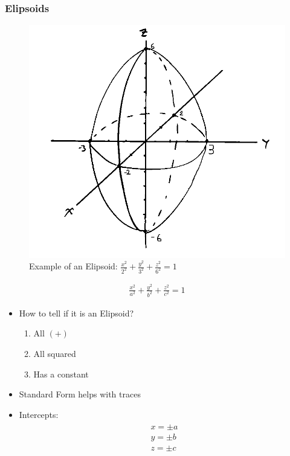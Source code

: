 \documentclass{article}
\begin{document}
\subsubsection{Elipsoids}
\begin{figure}[h]
  \includegraphics[scale=0.5]{elipsoid}
  \centering
  \caption{Example of an Elipsoid: $\frac{x^2}{2^2} + \frac{y^2}{3^2} + \frac{z^2}{6^2} = 1$}
  \label{fig:elipsoid}
\end{figure}
\begin{align}
  \frac{x^2}{a^2} + \frac{y^2}{b^2} + \frac{z^2}{c^2} = 1
\end{align}
\begin{itemize}
  \item How to tell if it is an Elipsoid?
  \begin{enumerate}
    \item All $(+)$
    \item All squared
    \item Has a constant
  \end{enumerate}
  \item Standard Form helps with traces
  \item Intercepts:
  \begin{align}
    \begin{split}
      x = \pm a \\
      y = \pm b \\
      z = \pm c
    \end{split}
  \end{align}
\end{itemize}
\end{document}
